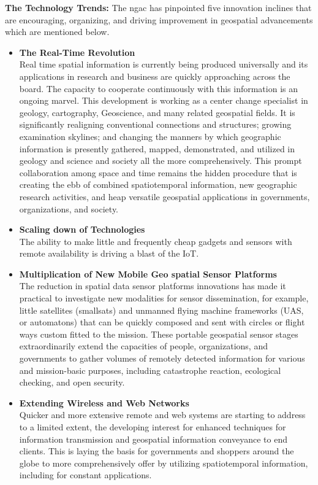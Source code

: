 \textbf{The Technology Trends:} The \gls{ngac} has pinpointed five innovation inclines that are encouraging, organizing, and driving improvement in geospatial advancements which are mentioned below. 

\begin{itemize}
  \item \textbf{The Real-Time Revolution} \\
 Real time spatial information is currently being produced universally and its applications in research and business are quickly approaching across the board. The capacity to cooperate continuously with this information is an ongoing marvel. This development is working as a center change specialist in geology, cartography, Geoscience, and many related geospatial fields. It is significantly realigning conventional connections and structures; growing examination skylines; and changing the manners by which geographic information is presently gathered, mapped, demonstrated, and utilized in geology and science and society all the more comprehensively. This prompt collaboration among space and time remains the hidden procedure that is creating the ebb of combined spatiotemporal information, new geographic research activities, and heap versatile geospatial applications in governments, organizations, and society. 
  
  \item  \textbf{Scaling down of Technologies} \\
 The ability to make little and frequently cheap gadgets and sensors with remote availability is driving a blast of the \gls{IoT}.
  
  \item  \textbf{Multiplication of New Mobile Geo spatial Sensor Platforms} \\
  The reduction in spatial data sensor platforms innovations has made it practical to investigate new modalities for sensor dissemination, for example, little satellites (smallsats) and unmanned flying machine frameworks (UAS, or automatons) that can be quickly composed and sent with circles or flight ways custom fitted to the mission. These portable geospatial sensor stages extraordinarily extend the capacities of people, organizations, and governments to gather volumes of remotely detected information for various and mission-basic purposes, including catastrophe reaction, ecological checking, and open security. 
  
  \item  \textbf{Extending Wireless and Web Networks} \\
 Quicker and more extensive remote and web systems are starting to address to a limited extent, the developing interest for enhanced techniques for information transmission and geospatial information conveyance to end clients. This is laying the basis for governments and shoppers around the globe to more comprehensively offer by utilizing spatiotemporal information, including for constant applications. 
  

\end{itemize}
